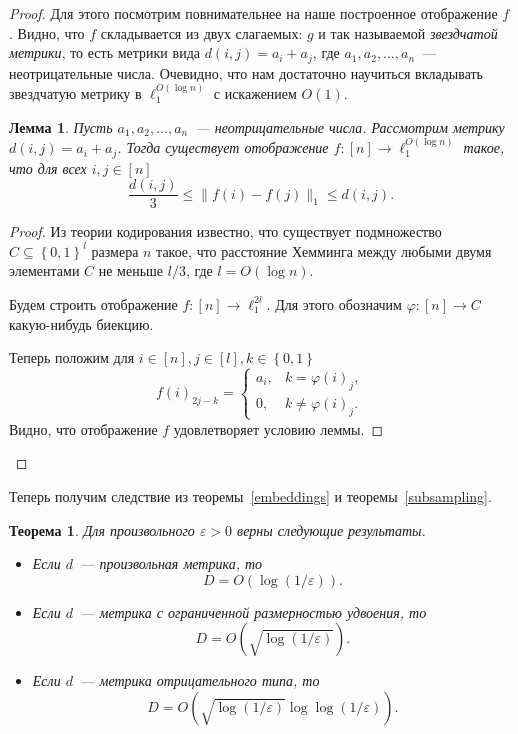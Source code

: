 \documentclass[12pt]{article}
\newcommand{\eps}{\varepsilon}
\newcommand{\set}[1]{\left\{#1\right\}}
\newcommand{\zo}{\set{0, 1}}
\newtheorem{theorem}{Теорема}
\newtheorem{lemma}{Лемма}
\begin{document}
\begin{proof}
        Для этого посмотрим повнимательнее на наше построенное отображение $f$. Видно, что $f$ складывается из
        двух слагаемых: $g$ и так называемой \emph{звездчатой метрики}, то есть метрики вида $d(i, j) = a_i + a_j$,
        где $a_1, a_2, \ldots, a_n$~--- неотрицательные числа.
        Очевидно, что нам достаточно научиться вкладывать звездчатую метрику в $\ell_1^{O(\log n)}$
        с искажением $O(1)$.

        \begin{lemma}
            Пусть $a_1, a_2, \ldots, a_n$~--- неотрицательные числа. Рассмотрим метрику $d(i, j) = a_i + a_j$.
            Тогда существует отображение $f \colon [n] \to \ell_1^{O(\log n)}$ такое, что для всех $i, j \in [n]$
            $$
                \frac{d(i, j)}{3} \leq \|f(i) - f(j)\|_1 \leq d(i, j).
            $$
        \end{lemma}
        \begin{proof}
            Из теории кодирования известно, что существует подмножество $C \subseteq \zo^{l}$ размера $n$
            такое, что расстояние Хемминга между любыми двумя элементами $C$ не меньше $l / 3$, где $l = O(\log n)$.

            Будем строить отображение $f \colon [n] \to \ell_1^{2l}$. Для этого обозначим $\varphi \colon [n] \to C$
            какую-нибудь биекцию.

            Теперь положим для $i \in [n], j \in [l], k \in \zo$
            $$
                f(i)_{2j-k} = \begin{cases}
                    a_i, & k = \varphi(i)_j, \\
                    0, & k \ne \varphi(i)_j.
                \end{cases}
            $$
            Видно, что отображение $f$ удовлетворяет условию леммы.
        \end{proof}
    \end{proof}

    Теперь получим следствие из теоремы~\ref{embeddings} и теоремы~\ref{subsampling}.
    \begin{theorem}
        Для произвольного $\eps > 0$ верны следующие результаты.
        \begin{itemize}
            \item
            Если $d$~--- произвольная метрика, то 
            $$
                D = O(\log (1 / \eps)).
            $$
            \item
            Если $d$~--- метрика с ограниченной размерностью удвоения, то
            $$
                D = O\left(\sqrt{\log (1 / \eps)}\right).
            $$
            \item
            Если $d$~--- метрика отрицательного типа, то
            $$
                D = O\left(\sqrt{\log (1 / \eps)} \log \log (1 / \eps)\right).
            $$
        \end{itemize}
    \end{theorem}
\end{document}
